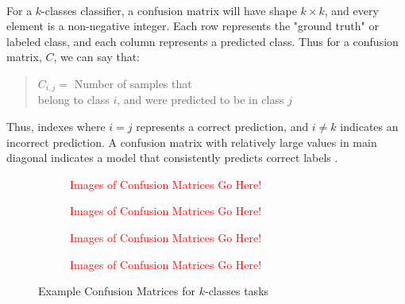 \documentclass[12pt,letterpaper]{article}
\begin{document}
\paragraph*{}For a $k$-classes classifier, a confusion matrix will have shape $k \times k$, and every element is a non-negative integer. Each row represents the "ground truth" or  labeled class, and each column represents a predicted class. Thus for a confusion matrix, $C$, we can say that:
\begin{quote}
\label{eqn-ConfMat}
\begin{center}
$C_{i,j} =$ Number of samples that \\ 
belong to class $i$, and were predicted to be in class $j$
\end{center}

\end{quote}
Thus, indexes where $i = j$ represents a correct prediction, and $i \neq k$ indicates an incorrect prediction. A confusion matrix with relatively large values in main diagonal indicates a model that consistently predicts correct labels \cite{Geron}. 

\begin{figure}[H]

	\begin{subfigure}[h]{0.45\textwidth}
	\begin{center}
	\textcolor{red}{Images of Confusion Matrices Go Here!} 
	\end{center}
	\end{subfigure}
	\begin{subfigure}[h]{0.45\textwidth}
	\begin{center}
	\textcolor{red}{Images of Confusion Matrices Go Here!} 
	\end{center}
	\end{subfigure}
	\begin{subfigure}[h]{0.45\textwidth}
	\begin{center}
	\textcolor{red}{Images of Confusion Matrices Go Here!} 
	\end{center}
	\end{subfigure}
	\begin{subfigure}[h]{0.45\textwidth}
	\begin{center}
	\textcolor{red}{Images of Confusion Matrices Go Here!} 
	\end{center}
	\end{subfigure}
\caption{Example Confusion Matrices for $k$-classes tasks}
\label{fig-ConfMat}
\end{figure}
 
\end{document}
